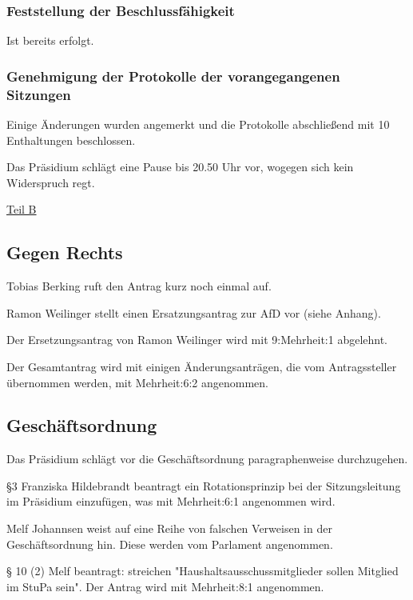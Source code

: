 \documentclass[ngerman,headheight=70pt]{scrartcl}
\begin{document}
    \subsubsection{Feststellung der Beschlussfähigkeit}

    Ist bereits erfolgt.

    \subsubsection{Genehmigung der Protokolle der vorangegangenen Sitzungen}

    Einige Änderungen wurden angemerkt und die Protokolle abschließend mit
    10 Enthaltungen beschlossen.

    Das Präsidium schlägt eine Pause bis 20.50 Uhr vor, wogegen sich kein
    Widerspruch regt.

    \vspace{1cm}
    {\Large \underline{Teil B}}

    \subsection{Gegen Rechts}

    Tobias Berking ruft den Antrag kurz noch einmal auf.

    Ramon Weilinger stellt einen Ersatzungsantrag zur AfD vor (siehe Anhang).

    Der Ersetzungsantrag von Ramon Weilinger wird mit 9:Mehrheit:1 abgelehnt.

    Der Gesamtantrag wird mit einigen Änderungsanträgen, die vom Antragssteller
    übernommen werden, mit Mehrheit:6:2 angenommen.

    \subsection{Geschäftsordnung}

    Das Präsidium schlägt vor die Geschäftsordnung paragraphenweise durchzugehen.

    §3 Franziska Hildebrandt beantragt ein Rotationsprinzip bei der
    Sitzungsleitung im Präsidium einzufügen, was mit Mehrheit:6:1 angenommen wird.

    Melf Johannsen weist auf eine Reihe von falschen Verweisen in der
    Geschäftsordnung hin. Diese werden vom Parlament angenommen.

    § 10 (2) Melf beantragt: streichen "Haushaltsausschussmitglieder sollen
    Mitglied im StuPa sein". Der Antrag wird mit Mehrheit:8:1 angenommen.
\end{document}
